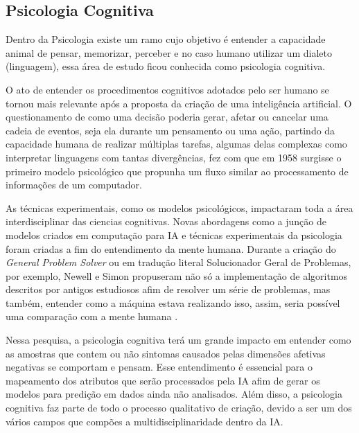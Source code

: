 \subsection{Psicologia Cognitiva}
Dentro da Psicologia existe um ramo cujo objetivo é entender a capacidade animal de pensar, memorizar, perceber e no caso humano utilizar um dialeto (linguagem), essa área de estudo ficou conhecida como psicologia cognitiva. \cite[3-9]{neisser2014cognitive}

O ato de entender os procedimentos cognitivos adotados pelo ser humano se tornou mais relevante após a proposta da criação de uma inteligência artificial. O questionamento de como uma decisão poderia gerar, afetar ou cancelar uma cadeia de eventos, seja ela durante um pensamento ou uma ação, partindo da capacidade humana de realizar múltiplas tarefas, algumas delas complexas como interpretar linguagens com tantas divergências, fez com que em 1958\cite[4-7]{broadbent1958perception} surgisse o primeiro modelo psicológico que propunha um fluxo similar ao processamento de informações de um computador.

As técnicas experimentais, como os modelos psicológicos, impactaram toda a área interdisciplinar das ciencias cognitivas. Novas abordagens como a junção de modelos criados em computação para IA e técnicas experimentais da psicologia foram criadas a fim do entendimento da mente humana. Durante a criação do \textit{General Problem Solver} ou em tradução literal Solucionador Geral de Problemas, por exemplo, Newell e Simon propuseram não só a implementação de algoritmos descritos por antigos estudiosos afim de resolver um série de problemas, mas também, entender como a máquina estava realizando isso, assim, seria possível uma comparação com a mente humana \cite{newell1961gps, russell2003artificial}.

Nessa pesquisa, a psicologia cognitiva terá um grande impacto em entender como as amostras que contem ou não sintomas causados pelas dimensões afetivas negativas se comportam e pensam. Esse entendimento é essencial para o mapeamento dos atributos que serão processados pela IA afim de gerar os modelos para predição em dados ainda não analisados. Além disso, a psicologia cognitiva faz parte de todo o processo qualitativo de criação, devido a ser um dos vários campos que compões a multidisciplinaridade dentro da IA.
